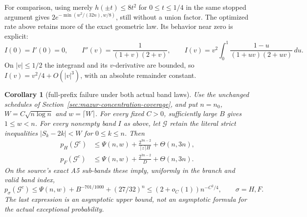 \documentclass[11pt]{article}
\newtheorem{corollary}[proposition]{Corollary}
\theoremstyle{remark}\newtheorem{remark}[proposition]{Remark}
\begin{document}
For comparison, using merely $h(\pm t)\le8t^2$ for $0\le t\le1/4$
in the same stopped argument gives
$2e^{-\min(w^2/(32n),w/8)}$, still without a union factor.
The optimized rate above retains more of the exact geometric law.
Its behavior near zero is explicit:
\[
 I(0)=I'(0)=0,\qquad I''(v)=\frac1{(1+v)(2+v)},\qquad
 I(v)=v^2\int_0^1\frac{1-u}{(1+uv)(2+uv)}\,du.
\]
On $|v|\le1/2$ the integrand and its $v$-derivative are bounded,
so $I(v)=v^2/4+O(|v|^3)$, with an absolute remainder constant.

\begin{corollary}[full-prefix failure under both actual band laws]
\label{cor:mazur-band-fullgood}
Use the unchanged schedules of
Section~\ref{sec:mazur-concentration-coverage}, and put $n=n_0$,
$W=C\sqrt{n\log n}$ and $w=\lceil W\rceil$.
For every fixed $C>0$, sufficiently large $B$ gives $1\le w<n$.
For every nonempty band $I$ as above, let $\mathcal G$ retain the
literal strict inequalities $|S_k-2k|<W$ for $0\le k\le n$.
Then
\begin{align}
 p_H(\mathcal G^c)
 &\le \Psi(n,w)+\frac{2^{3n-2}}{\lceil z\rceil H}
                  +\Theta(n,3n), \label{eq:mazur-harmonic-fullgood}\\
 p_F(\mathcal G^c)
 &\le \Psi(n,w)+\frac{2^{3n-2}}{D}
                  +\Theta(n,3n). \label{eq:mazur-flat-fullgood}
\end{align}
On the source's exact A5 sub-bands these imply, uniformly in the
branch and valid band index,
\begin{equation}
 p_\sigma(\mathcal G^c)
 \le\Psi(n,w)+B^{-701/1000}+(27/32)^n
 \le(2+o_C(1))n^{-C^2/4},\qquad \sigma=H,F.
 \label{eq:mazur-band-fullgood-rate}
\end{equation}
The last expression is an asymptotic upper bound, not an asymptotic
formula for the actual exceptional probability.
\end{corollary}
\end{document}
